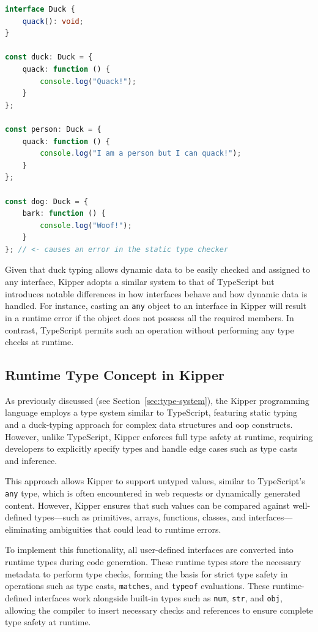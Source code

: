 \begin{lstlisting}[language=Typescript,caption=Example of duck typing in TypeScript,label=lst:implementation:javascriptducktyping]
interface Duck {
	quack(): void;
}

const duck: Duck = {
	quack: function () {
		console.log("Quack!");
	}
};

const person: Duck = {
	quack: function () {
		console.log("I am a person but I can quack!");
	}
};

const dog: Duck = {
	bark: function () {
		console.log("Woof!");
	}
}; // <- causes an error in the static type checker
\end{lstlisting}

Given that duck typing allows dynamic data to be easily checked and assigned to any interface, Kipper adopts a similar system to that of TypeScript but introduces notable differences in how interfaces behave and how dynamic data is handled. For instance, casting an \lstinline|any| object to an interface in Kipper will result in a runtime error if the object does not possess all the required members. In contrast, TypeScript permits such an operation without performing any type checks at runtime.

\subsection{Runtime Type Concept in Kipper}

As previously discussed (see Section~\ref{sec:type-system}), the Kipper programming language employs a type system similar to TypeScript, featuring static typing and a duck-typing approach for complex data structures and \acrshort{oop} constructs. However, unlike TypeScript, Kipper enforces full type safety at runtime, requiring developers to explicitly specify types and handle edge cases such as type casts and inference.

This approach allows Kipper to support untyped values, similar to TypeScript’s \lstinline|any| type, which is often encountered in web requests or dynamically generated content. However, Kipper ensures that such values can be compared against well-defined types—such as primitives, arrays, functions, classes, and interfaces—eliminating ambiguities that could lead to runtime errors.

To implement this functionality, all user-defined interfaces are converted into runtime types during code generation. These runtime types store the necessary metadata to perform type checks, forming the basis for strict type safety in operations such as type casts, \lstinline|matches|, and \lstinline|typeof| evaluations. These runtime-defined interfaces work alongside built-in types such as \lstinline|num|, \lstinline|str|, and \lstinline|obj|, allowing the compiler to insert necessary checks and references to ensure complete type safety at runtime.

